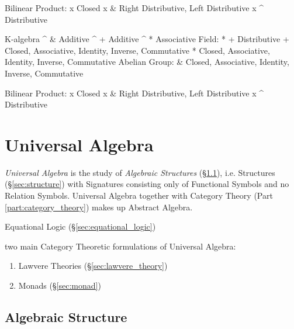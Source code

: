             Bilinear
            Product:
                      x Closed
                    x & Right Distributive, Left Distributive
                    x ^ Distributive

    K-algebra
                    ^ & Additive
                    ^ + Additive
                    ^ * Associative
             Field: * + Distributive
                      + Closed, Associative, Identity, Inverse, Commutative
                      * Closed, Associative, Identity, Inverse, Commutative
            Abelian
             Group:   & Closed, Associative, Identity, Inverse, Commutative

            Bilinear
            Product:
                      x Closed
                    x & Right Distributive, Left Distributive
                    x ^ Distributive


\fi


\section{Universal Algebra}\label{sec:universal_algebra}

\emph{Universal Algebra} is the study of \emph{Algebraic Structures}
(\S\ref{sec:algebraic_structure}), i.e. Structures
(\S\ref{sec:structure}) with Signatures consisting only of Functional
Symbols and no Relation Symbols. Universal Algebra together with
Category Theory (Part \ref{part:category_theory}) makes up Abstract
Algebra.

Equational Logic (\S\ref{sec:equational_logic})

two main Category Theoretic formulations of Universal Algebra:

\begin{enumerate}
  \item Lawvere Theories (\S\ref{sec:lawvere_theory})
  \item Monads (\S\ref{sec:monad})
\end{enumerate}



\subsection{Algebraic Structure}\label{sec:algebraic_structure}

